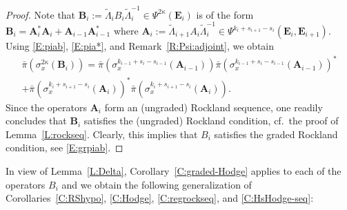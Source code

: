 \documentclass[reqno,12pt]{amsart}
\theoremstyle{plain}
\theoremstyle{definition}
\begin{document}
\begin{proof}
Note that $\mathbf B_i:=\tilde\Lambda_iB_i\tilde\Lambda_i^{-1}\in\Psi^{2\kappa}(\mathbf E_i)$ is of the form $\mathbf B_i=\mathbf A_i^*\mathbf A_i+\mathbf A_{i-1}\mathbf A_{i-1}^*$ where $\mathbf A_i:=\tilde\Lambda_{i+1}A_i\tilde\Lambda_i^{-1}\in\Psi^{k_i+s_{i+1}-s_i}(\mathbf E_i,\mathbf E_{i+1})$.
Using \eqref{E:piab}, \eqref{E:pia*}, and Remark~\ref{R:Psi:adjoint}, we obtain
\begin{multline*}
\bar\pi(\sigma^{2\kappa}_x(\mathbf B_i))
=\bar\pi(\sigma^{k_{i-1}+s_i-s_{i-1}}_x(\mathbf A_{i-1}))\bar\pi(\sigma^{k_{i-1}+s_i-s_{i-1}}_x(\mathbf A_{i-1}))^*
\\+\bar\pi(\sigma^{k_i+s_{i+1}-s_i}_x(\mathbf A_i))^*\bar\pi(\sigma^{k_i+s_{i+1}-s_i}_x(\mathbf A_i)).
\end{multline*}
Since the operators $\mathbf A_i$ form an (ungraded) Rockland sequence, one readily concludes that $\mathbf B_i$ satisfies the (ungraded) Rockland condition, cf.\ the proof of Lemma~\ref{L:rockseq}.
Clearly, this implies that $B_i$ satisfies the graded Rockland condition, see \eqref{E:grpiab}.
\end{proof}


In view of Lemma~\ref{L:Delta}, Corollary~\ref{C:graded-Hodge} applies to each of the operators $B_i$ and we obtain the following generalization of Corollaries~\ref{C:RShypo}, \ref{C:Hodge}, \ref{C:regrockseq}, and \ref{C:HsHodge-seq}:
\end{document}
